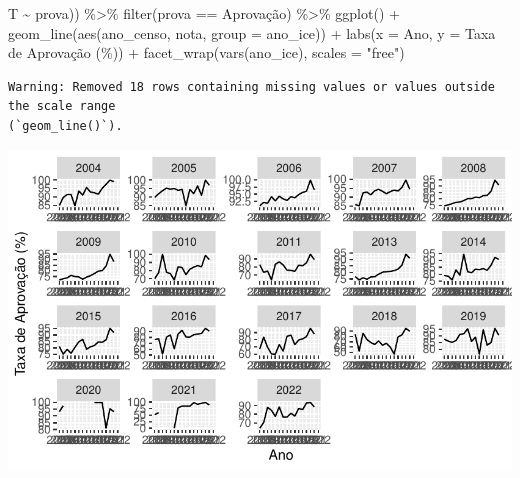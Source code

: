 \documentclass[
  letterpaper,
  DIV=11,
  numbers=noendperiod]{scrartcl}
\newenvironment{Shaded}{\begin{snugshade}}{\end{snugshade}}
\newcommand{\AttributeTok}[1]{\textcolor[rgb]{0.40,0.45,0.13}{#1}}
\newcommand{\FunctionTok}[1]{\textcolor[rgb]{0.28,0.35,0.67}{#1}}
\newcommand{\NormalTok}[1]{\textcolor[rgb]{0.00,0.23,0.31}{#1}}
\newcommand{\SpecialCharTok}[1]{\textcolor[rgb]{0.37,0.37,0.37}{#1}}
\newcommand{\StringTok}[1]{\textcolor[rgb]{0.13,0.47,0.30}{#1}}
\begin{document}
\begin{Shaded}
\begin{Highlighting}[]
\NormalTok{                         T }\SpecialCharTok{\textasciitilde{}}\NormalTok{ prova)) }\SpecialCharTok{\%\textgreater{}\%} 
  \FunctionTok{filter}\NormalTok{(prova }\SpecialCharTok{==} \StringTok{\textquotesingle{}Aprovação\textquotesingle{}}\NormalTok{) }\SpecialCharTok{\%\textgreater{}\%} 
  \FunctionTok{ggplot}\NormalTok{() }\SpecialCharTok{+}
  \FunctionTok{geom\_line}\NormalTok{(}\FunctionTok{aes}\NormalTok{(ano\_censo, nota, }\AttributeTok{group =}\NormalTok{ ano\_ice)) }\SpecialCharTok{+}
  \FunctionTok{labs}\NormalTok{(}\AttributeTok{x =} \StringTok{\textquotesingle{}Ano\textquotesingle{}}\NormalTok{, }\AttributeTok{y =} \StringTok{\textquotesingle{}Taxa de Aprovação (\%)\textquotesingle{}}\NormalTok{) }\SpecialCharTok{+}
  \FunctionTok{facet\_wrap}\NormalTok{(}\FunctionTok{vars}\NormalTok{(ano\_ice), }\AttributeTok{scales =} \StringTok{"free"}\NormalTok{)}
\end{Highlighting}
\end{Shaded}

\begin{verbatim}
Warning: Removed 18 rows containing missing values or values outside the scale range
(`geom_line()`).
\end{verbatim}

\includegraphics{script_files/figure-latex/unnamed-chunk-12-1.pdf}
\end{document}
